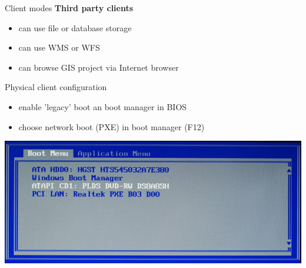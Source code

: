 \documentclass[12pt]{beamer}
\begin{document}
\begin{frame}{Client modes}
	\textbf{Third party clients}
	\begin{itemize}
		\item can use file or database storage
		\item can use WMS or WFS 
		\item can browse GIS project via Internet browser
	\end{itemize}
\end{frame}


\begin{frame}{Physical client configuration}
	\begin{itemize}
		\item enable 'legacy' boot an boot manager in BIOS
		\item choose network boot (PXE) in boot manager (F12)
	\end{itemize}
	\begin{center}
		\includegraphics[keepaspectratio=true,height=0.6\textheight]{images/real-world-example/client-physical-configuration.png}
	\end{center}
\end{frame}
\end{document}

